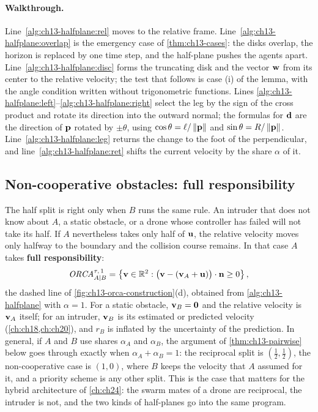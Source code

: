 \paragraph{Walkthrough.}
Line~\ref{alg:ch13-halfplane:rel} moves to the relative frame.
Line~\ref{alg:ch13-halfplane:overlap} is the emergency case of
\cref{thm:ch13-cases}: the disks overlap, the horizon is replaced by one time
step, and the half-plane pushes the agents apart. Line~\ref{alg:ch13-halfplane:disc}
forms the truncating disk and the vector $\mathbf{w}$ from its center to the
relative velocity; the test that follows is case (i) of the lemma, with the
angle condition written without trigonometric functions. Lines
\ref{alg:ch13-halfplane:left}--\ref{alg:ch13-halfplane:right} select the leg
by the sign of the cross product and rotate its direction into the outward
normal; the formulas for $\mathbf{d}$ are the direction of $\mathbf{p}$ rotated by
$\pm\theta$, using $\cos\theta = \ell/\left\lVert \mathbf{p} \right\rVert$ and
$\sin\theta = R/\left\lVert \mathbf{p} \right\rVert$. Line~\ref{alg:ch13-halfplane:leg} returns the
change to the foot of the perpendicular, and
line~\ref{alg:ch13-halfplane:ret} shifts the current velocity by the share
$\alpha$ of it.

\subsection{Non-cooperative obstacles: full responsibility}
\label{sec:ch13-noncooperative}

The half split is right only when $B$ runs the same rule. An intruder that
does not know about $A$, a static obstacle, or a drone whose controller has
failed will not take its half. If $A$ nevertheless takes only half of
$\mathbf{u}$, the relative velocity moves only halfway to the boundary and the
collision course remains. In that case $A$ takes \textbf{full
responsibility}:
\begin{equation}
  \mathit{ORCA}^{\tau,\,1}_{A|B} = \left\{ \mathbf{v} \in \mathbb{R}^2 : \bigl(\mathbf{v} - (\mathbf{v}_A + \mathbf{u})\bigr)\cdot\mathbf{n} \ge 0 \right\},
  \label{eq:ch13-orca-full}
\end{equation}
the dashed line of \cref{fig:ch13-orca-construction}(d), obtained from
\cref{alg:ch13-halfplane} with $\alpha = 1$. For a static obstacle,
$\mathbf{v}_B = \mathbf{0}$ and the relative velocity is $\mathbf{v}_A$ itself; for an
intruder, $\mathbf{v}_B$ is its estimated or predicted velocity
(\cref{ch:ch18,ch:ch20}), and $r_B$ is inflated by the uncertainty of the
prediction. In general, if $A$ and $B$ use shares $\alpha_A$ and $\alpha_B$,
the argument of \cref{thm:ch13-pairwise} below goes through exactly when
$\alpha_A + \alpha_B = 1$: the reciprocal split is $(\tfrac12, \tfrac12)$,
the non-cooperative case is $(1, 0)$, where $B$ keeps the velocity that $A$
assumed for it, and a priority scheme is any other split. This is the case
that matters for the hybrid architecture of \cref{ch:ch24}: the swarm mates
of a drone are reciprocal, the intruder is not, and the two kinds of
half-planes go into the same program.

